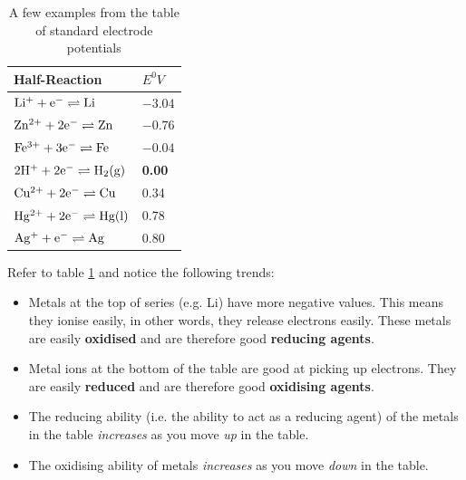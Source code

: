 \begin{table}[h]
\begin{center}
\begin{tabular}{|l|l|}\hline 
\textbf{Half-Reaction}
&
\textbf{$E^{0}V$} \\ \hline\hline
$\rm{Li^{+} + e^{-} \rightleftharpoons Li}$ & $-3.04$ \\ \hline
$\rm{Zn^{2+} + 2e^{-} \rightleftharpoons Zn }$& $-0.76$ \\ \hline
$\rm{Fe^{3+} + 3e^{-} \rightleftharpoons Fe} $& $-0.04$ \\ \hline
$\rm{2H^{+} + 2e^{-} \rightleftharpoons H_{2} (g) }$& \textbf{0.00} \\ \hline
$\rm{Cu^{2+} + 2e^{-} \rightleftharpoons Cu }$& 0.34 \\ \hline
$\rm{Hg^{2+} + 2e^{-} \rightleftharpoons Hg (l) }$& 0.78 \\ \hline
$\rm{Ag^{+} + e^{-} \rightleftharpoons Ag }$& 0.80 \\ \hline
\end{tabular}
\end{center}
\caption{A few examples from the table of standard electrode potentials}
\label{tab:electrochemical:table sep abbrev}
\end{table}

Refer to table \ref{tab:electrochemical:table sep abbrev} and notice the following trends:

\begin{itemize}
\item{Metals at the top of series (e.g. Li) have more negative values. This means they ionise easily, in other words, they release electrons easily. These metals are easily \textbf{oxidised} and are therefore good \textbf{reducing agents}.}
\item{Metal ions at the bottom of the table are good at picking up electrons. They are easily \textbf{reduced} and are therefore good \textbf{oxidising agents}.}
\item{The reducing ability (i.e. the ability to act as a reducing agent) of the metals in the table \textit{increases} as you move \textit{up} in the table.}
\item{The oxidising ability of metals \textit{increases} as you move \textit{down} in the table.}
\end{itemize}

